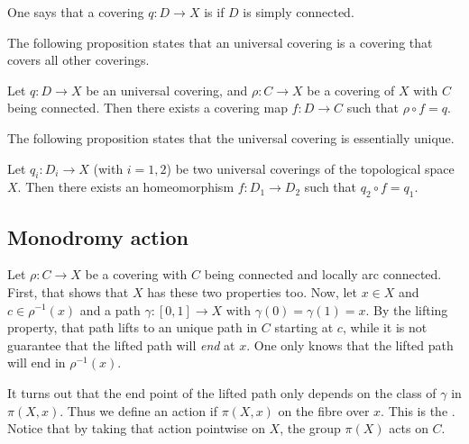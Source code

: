 \begin{definition}
	One says that a covering \( q\colon D\to X\) is  if \( D\) is simply connected.
\end{definition}

The following proposition states that an universal covering is a covering that covers all other coverings.

\begin{proposition}
	Let \( q\colon D\to X\) be an universal covering, and \( \rho\colon C\to X\) be a covering of \( X\) with \( C\) being connected. Then there exists a covering map \( f\colon D\to C\) such that \( \rho\circ f=q\).
\end{proposition}

The following proposition states that the universal covering is essentially unique.

\begin{proposition}
	Let \( q_i\colon D_i\to X\) (with \( i=1,2\)) be two universal coverings of the topological space \( X\). Then there exists an homeomorphism \( f\colon D_1\to D_2\) such that \( q_2\circ f=q_1\).
\end{proposition}

\subsection{Monodromy action}
\label{sssMonodromyact}

Let \( \rho\colon C\to X\) be a covering with \( C\) being connected and locally arc connected. First, that shows that \( X\) has these two properties too. Now, let \( x\in X\) and \( c\in\rho^{-1}(x)\) and a path \( \gamma\colon [0,1]\to X\) with \( \gamma(0)=\gamma(1)=x\). By the lifting property, that path lifts to an unique path in \( C\) starting at \( c\), while it is not guarantee that the lifted path will \emph{end} at \( x\). One only knows that the lifted path will end in \( \rho^{-1}(x)\).

It turns out that the end point of the lifted path only depends on the class of \( \gamma\) in \( \pi(X,x)\). Thus we define an action if \( \pi(X,x)\) on the fibre over \( x\). This is the . Notice that by taking that action pointwise on \( X\), the group \( \pi(X)\) acts on \( C\).

